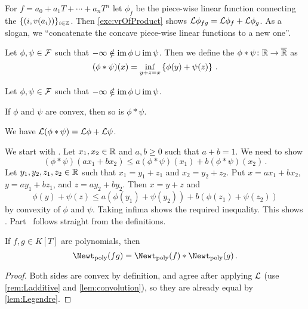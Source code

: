 \begin{rem}\label{rem:Ladditive}
	For $f=a_0+a_1T+\dotsb+a_nT^n$ let $\phi_f$ be the piece-wise linear function connecting the $\{(i,v(a_i))\}_{i\in\mathbb{Z}}$. Then \cref{exc:vrOfProduct} shows $\Ll\phi_{fg}=\Ll\phi_f+\Ll\phi_g$. As a slogan, we \enquote{concatenate the concave piece-wise linear functions to a new one}.
\end{rem}
\begin{defi}
	Let $\phi,\psi\in\Ff$ such that $-\infty\notin \im\phi\cup\im\psi$. Then we define the  $\phi*\psi\colon \IR\morphism\ov{\IR}$ as
	\begin{equation*}
		(\phi*\psi)(x)=\inff_{y+z=x}\left\{\phi(y)+\psi(z)\right\}\,.
	\end{equation*}
\end{defi}
\begin{lem}\label{lem:convolution}
	Let $\phi,\psi\in\Ff$ such that $-\infty\notin \im\phi\cup\im\psi$.
	\begin{numerate}
		\item If $\phi$ and $\psi$ are convex, then so is $\phi*\psi$.
		\item We have $\Ll(\phi*\psi)=\Ll\phi+\Ll\psi$.
	\end{numerate}
\end{lem}
\begin{proof*}
	We start with . Let $x_1,x_2\in\mathbb{R}$ and $a,b\geq 0$ such that $a+b=1$. We need to show
	\begin{equation*}
		(\phi*\psi)(ax_1+bx_2)\leq a(\phi*\psi)(x_1)+b(\phi*\psi)(x_2)\,.
	\end{equation*}
	Let $y_1,y_2,z_1,z_2\in\mathbb{R}$ such that $x_1=y_1+z_1$ and $x_2=y_2+z_2$. Put $x=ax_1+bx_2$, $y=ay_1+bz_1$, and $z=ay_2+by_2$. Then $x=y+z$ and 
	\begin{equation*}
		\phi(y)+\psi(z)\leq a(\phi(y_1)+\psi(y_2))+b(\phi(z_1)+\psi(z_2))
	\end{equation*}
	by convexity of $\phi$ and $\psi$. Taking infima shows the required inequality. This shows . Part~ follows straight from the definitions.
\end{proof*}
\begin{cor}\label{cor:NewtConvolution}
	If $f,g\in K[T]$ are polynomials, then
	\begin{equation*}
		\Newt_\poly(fg)=\Newt_\poly(f)*\Newt_\poly(g)\,.
	\end{equation*}
\end{cor}
\begin{proof}
	Both sides are convex by definition, and agree after applying $\mathcal{L}$ (use \cref{rem:Ladditive} and \cref{lem:convolution}), so they are already equal by \cref{lem:Legendre}.
\end{proof}
